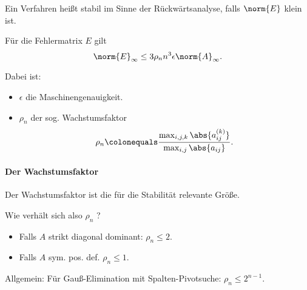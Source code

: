 \bigskip

Ein Verfahren heißt stabil im Sinne der Rückwärtsanalyse, falls $\norm{E}$ klein ist.

\medskip

Für die Fehlermatrix $E$ gilt
\begin{equation*}
 \norm{E}_\infty\leq 3\rho_n n^3\epsilon \norm{A}_\infty.
\end{equation*}

Dabei ist:

\begin{itemize}
\item $\epsilon$ die Maschinengenauigkeit.
\item $\rho_n$ der sog. Wachstumsfaktor
 \[
  \rho_n \colonequals \frac{\max_{i,j,k}\abs{a^{(k)}_{ij}}}{\max_{i,j}\abs{a_{ij}}}.
 \]

\end{itemize}


\paragraph{Der Wachstumsfaktor}

Der Wachstumsfaktor ist die für die Stabilität relevante Größe.

Wie verhält sich also $\rho_n$ ?
\begin{itemize}
  \item Falls $A$ strikt diagonal dominant: $\rho_n\leq 2$.
 \item Falls $A$ sym. pos. def. $\rho_n\leq 1$.
\end{itemize}


Allgemein: Für Gauß-Elimination mit Spalten-Pivotsuche: $\rho_n\leq 2^{n-1}$.

\bigskip

